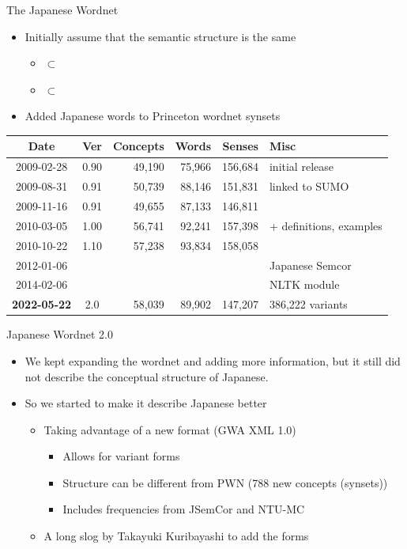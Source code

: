 \documentclass{beamer}
\begin{document}
\begin{frame}{The Japanese Wordnet}
\begin{itemize}
\item Initially assume that the semantic structure is the same
  \begin{itemize}
  \item {} $\subset$ 
  \item[$\Rightarrow$]  $\subset$ 
  \end{itemize}
\item Added Japanese words to Princeton wordnet synsets
\end{itemize}

\begin{tabular}{ccrrrl}
  Date       & Ver & Concepts & Words & Senses  & Misc \\ \hline
  2009-02-28 & 0.90 &  49,190 & 75,966 & 156,684 & initial release \\
  2009-08-31 & 0.91 &  50,739 & 88,146 & 151,831 & linked to SUMO \\
  2009-11-16 & 0.91 &  49,655 & 87,133 & 146,811  & \\
  2010-03-05 & 1.00 &  56,741 & 92,241 & 157,398 & + definitions, examples \\
  2010-10-22 & 1.10 &  57,238 & 93,834 & 158,058 & \\
  2012-01-06 &      &         &        &          & Japanese Semcor \\
  2014-02-06 &      &         &        &          & NLTK module \\
  \textbf{2022-05-22} & 2.0  &  58,039 & 89,902 & 147,207 & 386,222  variants \\
\end{tabular}
\end{frame}

\begin{frame}{Japanese Wordnet 2.0}

   \begin{itemize}
   \item We kept expanding the wordnet and adding more information, but it still did not describe the conceptual structure of Japanese.  
   \item So we started to make it describe Japanese better

     \begin{itemize}
     \item Taking advantage of a new format (GWA XML 1.0)
       \begin{itemize}
       \item Allows for variant forms
       \item Structure can be different from PWN (788 new concepts (synsets))
       \item Includes frequencies from JSemCor and NTU-MC
       \end{itemize}
     \item A long slog by Takayuki Kuribayashi to add the forms
     \end{itemize}
   \end{itemize}

\end{frame}
 
\end{document}
